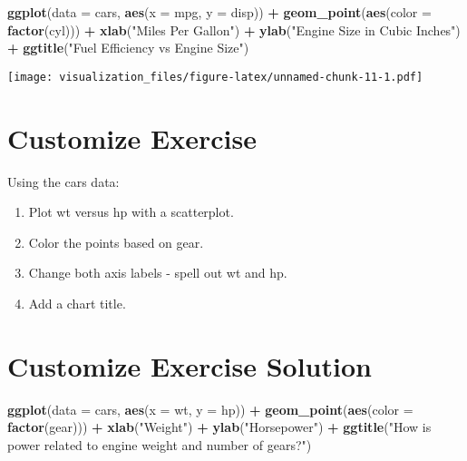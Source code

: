 \documentclass[oneside]{memoir}
\newenvironment{Shaded}{\begin{snugshade}}{\end{snugshade}}
\newcommand{\KeywordTok}[1]{\textcolor[rgb]{0.13,0.29,0.53}{\textbf{#1}}}
\newcommand{\DataTypeTok}[1]{\textcolor[rgb]{0.13,0.29,0.53}{#1}}
\newcommand{\StringTok}[1]{\textcolor[rgb]{0.31,0.60,0.02}{#1}}
\newcommand{\OperatorTok}[1]{\textcolor[rgb]{0.81,0.36,0.00}{\textbf{#1}}}
\newcommand{\NormalTok}[1]{#1}
\theoremstyle{definition}
\theoremstyle{definition}
\theoremstyle{definition}
\theoremstyle{remark}
\begin{document}
\begin{Shaded}
\begin{Highlighting}[]
\KeywordTok{ggplot}\NormalTok{(}\DataTypeTok{data =}\NormalTok{ cars, }\KeywordTok{aes}\NormalTok{(}\DataTypeTok{x =}\NormalTok{ mpg, }\DataTypeTok{y =}\NormalTok{ disp)) }\OperatorTok{+}
\StringTok{  }\KeywordTok{geom_point}\NormalTok{(}\KeywordTok{aes}\NormalTok{(}\DataTypeTok{color =} \KeywordTok{factor}\NormalTok{(cyl))) }\OperatorTok{+}
\StringTok{  }\KeywordTok{xlab}\NormalTok{(}\StringTok{"Miles Per Gallon"}\NormalTok{) }\OperatorTok{+}
\StringTok{  }\KeywordTok{ylab}\NormalTok{(}\StringTok{"Engine Size in Cubic Inches"}\NormalTok{) }\OperatorTok{+}
\StringTok{  }\KeywordTok{ggtitle}\NormalTok{(}\StringTok{"Fuel Efficiency vs Engine Size"}\NormalTok{)}
\end{Highlighting}
\end{Shaded}

\texttt{[image: visualization\_files/figure-latex/unnamed-chunk-11-1.pdf]}

\section{Customize Exercise}\label{customize-exercise}

Using the cars data:

\begin{enumerate}
\def\labelenumi{\arabic{enumi}.}
\item
  Plot wt versus hp with a scatterplot.
\item
  Color the points based on gear.
\item
  Change both axis labels - spell out wt and hp.
\item
  Add a chart title.
\end{enumerate}

\section{Customize Exercise Solution}\label{customize-exercise-solution}

\begin{Shaded}
\begin{Highlighting}[]
\KeywordTok{ggplot}\NormalTok{(}\DataTypeTok{data =}\NormalTok{ cars, }\KeywordTok{aes}\NormalTok{(}\DataTypeTok{x =}\NormalTok{ wt, }\DataTypeTok{y =}\NormalTok{ hp)) }\OperatorTok{+}
\StringTok{  }\KeywordTok{geom_point}\NormalTok{(}\KeywordTok{aes}\NormalTok{(}\DataTypeTok{color =} \KeywordTok{factor}\NormalTok{(gear))) }\OperatorTok{+}
\StringTok{  }\KeywordTok{xlab}\NormalTok{(}\StringTok{"Weight"}\NormalTok{) }\OperatorTok{+}
\StringTok{  }\KeywordTok{ylab}\NormalTok{(}\StringTok{"Horsepower"}\NormalTok{) }\OperatorTok{+}
\StringTok{  }\KeywordTok{ggtitle}\NormalTok{(}\StringTok{"How is power related to engine weight and number of gears?"}\NormalTok{)}
\end{Highlighting}
\end{Shaded}
\end{document}
